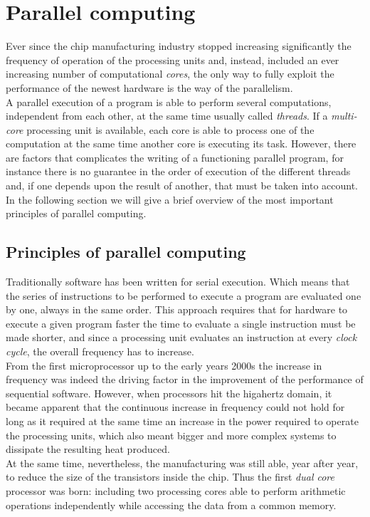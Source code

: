 \chapter{Parallel computing}\label{ch:gpu}
Ever since the chip manufacturing industry stopped increasing significantly the frequency of operation of the processing units and, instead, included an ever increasing number of computational \textit{cores}, the only way to fully exploit the performance of the newest hardware is the way of the parallelism.\\
A parallel execution of a program is able to perform several computations, independent from each other, at the same time usually called \textit{threads}. If a \textit{multi-core} processing unit is available, each core is able to process one of the computation at the same time another core is executing its task. However, there are factors that complicates the writing of a functioning parallel program, for instance there is no guarantee in the order of execution of the different threads and, if one depends upon the result of another, that must be taken into account.\\
In the following section we will give a brief overview of the most important principles of parallel computing.

\section{Principles of parallel computing}
Traditionally software has been written for serial execution. Which means that the series of instructions to be performed to execute a program are evaluated one by one, always in the same order. This approach requires that for hardware to execute a given program faster the time to evaluate a single instruction must be made shorter, and since a processing unit evaluates an instruction at every \textit{clock cycle}, the overall frequency has to increase.\\
From the first microprocessor up to the early years 2000s the increase in frequency was indeed the driving factor in the improvement of the performance of sequential software. However, when processors hit the higahertz domain, it became apparent that the continuous increase in frequency could not hold for long as it required at the same time an increase in the power required to operate the processing units, which also meant bigger and more complex systems to dissipate the resulting heat produced.\\
At the same time, nevertheless, the manufacturing was still able, year after year, to reduce the size of the transistors inside the chip. Thus the first \textit{dual core} processor was born: including two processing cores able to perform arithmetic operations independently while accessing the data from a common memory.\\

